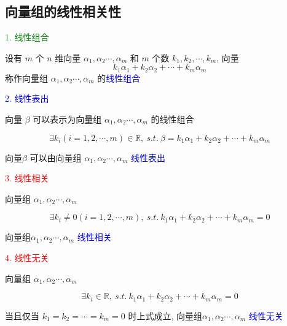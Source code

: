 \subsection{向量组的线性相关性}

\begin{definition}[线性相关和线性表出]
	\textcolor{green}{1. 线性组合}
	
	设有 $m$ 个 $n$ 维向量 $\alpha_{1},\alpha_{2}\cdots,\alpha_{m}$ 和 $m$ 个数 $k_{1},k_{2},\cdots,k_{m}$, 向量
	$$k_{1}\alpha_{1}+k_{2}\alpha_{2}+\cdots+k_{m}\alpha_{m}$$
	称作向量组 $\alpha_{1},\alpha_{2}\cdots,\alpha_{m}$ 的\textcolor{blue}{线性组合}
	
	\textcolor{blue}{2. 线性表出}
	
	向量 $\beta$ 可以表示为向量组 $\alpha_{1},\alpha_{2}\cdots,\alpha_{m}$ 的线性组合
	
	$$\exists k_{i}(i = 1,2,\cdots,m)\in  \mathbb{R},\ s.t.\ \beta=k_{1}\alpha_{1}+k_{2}\alpha_{2}+\cdots+k_{m}\alpha_{m}$$

	向量$\beta$ 可以由向量组 $\alpha_{1},\alpha_{2}\cdots,\alpha_{m}$ \textcolor{blue}{线性表出}
	
	\textcolor{red}{3. 线性相关}
	
	向量组 $\alpha_{1},\alpha_{2}\cdots,\alpha_{m}$

	$$\exists k_{i}\neq 0(i=1,2,\cdots,m), \ s.t. \ k_{1}\alpha_{1}+k_{2}\alpha_{2}+\cdots+k_{m}\alpha_{m} = 0$$
	
	向量组$\alpha_{1},\alpha_{2}\cdots,\alpha_{m}$ \textcolor{blue}{线性相关}
	
	\textcolor{red}{4. 线性无关}
	
	向量组 $\alpha_{1},\alpha_{2}\cdots,\alpha_{m}$

	$$\exists k_{i}\in \mathbb{R},\ s.t.\ k_{1}\alpha_{1}+k_{2}\alpha_{2}+\cdots+k_{m}\alpha_{m} = 0$$

	当且仅当 $k_{1}=k_{2}=\cdots=k_{m}=0$ 时上式成立, 向量组$\alpha_{1},\alpha_{2}\cdots,\alpha_{m}$ \textcolor{blue}{线性无关}
\end{definition}

